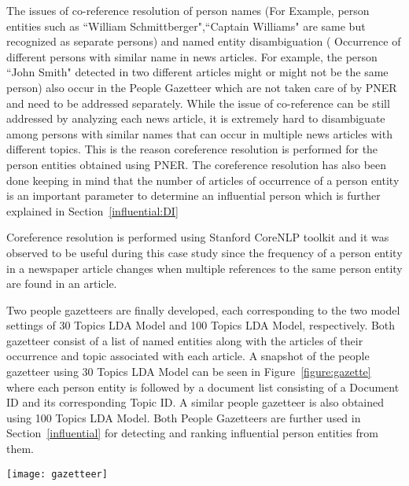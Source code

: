 The issues of co-reference resolution of person names (For Example, person entities such as ``William Schmittberger",``Captain Williams" are same but recognized as separate persons) and named entity disambiguation ( Occurrence of different persons with similar name in news articles. For example, the person ``John Smith" detected in two different articles might or might not be the same person) also occur in the People Gazetteer which are not taken care of by PNER and need to be addressed separately. While the issue of co-reference can be still addressed by analyzing each news article, it is extremely hard to disambiguate among persons with similar names that can occur in multiple news articles with different topics. This is the reason coreference resolution is performed for the person entities obtained using PNER. The coreference resolution has also been done keeping in mind that the number of articles of occurrence of a person entity is an important parameter to determine an influential person which is further explained in Section~\ref{influential:DI}

Coreference resolution is performed using Stanford CoreNLP toolkit and it was observed to be useful during this case study since the frequency of a person entity in a newspaper article changes when multiple references to the same person entity are found in an article. 

Two people gazetteers are finally developed, each corresponding to the two model settings of 30 Topics LDA Model and 100 Topics LDA Model, respectively. Both gazetteer consist of a list of named entities along with the articles of their occurrence and topic associated with each article. A snapshot of the people gazetteer using 30 Topics LDA Model can be seen in Figure~\ref{figure:gazette} where each person entity is followed by a document list consisting of a Document ID and its corresponding Topic ID. A similar people gazetteer is also obtained using 100 Topics LDA Model. Both People Gazetteers are further used in Section~\ref{influential} for detecting and ranking influential person entities from them.
\begin{figure*}
\centering
\texttt{[image: gazetteer]}
\caption{Snapshot of People Gazetteer with Person names, Document list of occurrence and their corresponding Topic ID}
\label{figure:gazette}
\end{figure*} 

